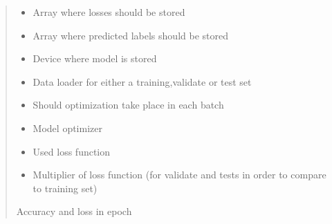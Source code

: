 \documentclass[letterpaper,10pt,english]{sphinxmanual}
\begin{document}
\begin{fulllineitems}
\begin{fulllineitems}
\begin{quote}
\begin{description}
\begin{itemize}
\item {} 
\sphinxAtStartPar
{} \textendash{} Array where losses should be stored

\item {} 
\sphinxAtStartPar
{} \textendash{} Array where predicted labels should be stored

\item {} 
\sphinxAtStartPar
{} \textendash{} Device where model is stored

\item {} 
\sphinxAtStartPar
{} \textendash{} Data loader for either a training,validate or test set

\item {} 
\sphinxAtStartPar
{} \textendash{} Should optimization take place in each batch

\item {} 
\sphinxAtStartPar
{} \textendash{} Model optimizer

\item {} 
\sphinxAtStartPar
{} \textendash{} Used loss function

\item {} 
\sphinxAtStartPar
{} \textendash{} Multiplier of loss function (for validate and tests in order to compare to training set)

\end{itemize}

\sphinxAtStartPar
Accuracy and loss in epoch

\end{description}\end{quote}

\end{fulllineitems}



\end{fulllineitems}
\end{document}
